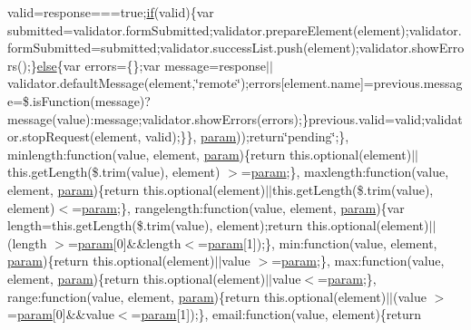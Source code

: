 \begin{DoxyCompactItemize}
valid=response===true;\hyperlink{_scripts_2respond_8min_8js_a93851d60dd037a83509a1757b9ee7b66}{if}(valid)\{var submitted=validator.\+form\+Submitted;validator.\+prepare\+Element(element);validator.\+form\+Submitted=submitted;validator.\+success\+List.\+push(element);validator.\+show\+Errors();\}\hyperlink{_scripts_2jquery_8validate_8js_a0544c3fe466e421738dae463968b70ba}{else}\{var errors=\{\};var message=response$\vert$$\vert$validator.\+default\+Message(element,\char`\"{}remote\char`\"{});errors\mbox{[}element.\+name\mbox{]}=previous.\+message=\$.is\+Function(message)?message(value)\+:message;validator.\+show\+Errors(errors);\}previous.\+valid=valid;validator.\+stop\+Request(element, valid);\}\}, \hyperlink{_scripts_2jquery-1_810_82_8min_8js_ae8915303d11557d1b001bc56b6195251}{param}));return\char`\"{}pending\char`\"{};\}, minlength\+:function(value, element, \hyperlink{_scripts_2jquery-1_810_82_8min_8js_ae8915303d11557d1b001bc56b6195251}{param})\{return this.\+optional(element)$\vert$$\vert$this.\+get\+Length(\$.trim(value), element) $>$=\hyperlink{_scripts_2jquery-1_810_82_8min_8js_ae8915303d11557d1b001bc56b6195251}{param};\}, maxlength\+:function(value, element, \hyperlink{_scripts_2jquery-1_810_82_8min_8js_ae8915303d11557d1b001bc56b6195251}{param})\{return this.\+optional(element)$\vert$$\vert$this.\+get\+Length(\$.trim(value), element)$<$=\hyperlink{_scripts_2jquery-1_810_82_8min_8js_ae8915303d11557d1b001bc56b6195251}{param};\}, rangelength\+:function(value, element, \hyperlink{_scripts_2jquery-1_810_82_8min_8js_ae8915303d11557d1b001bc56b6195251}{param})\{var length=this.\+get\+Length(\$.trim(value), element);return this.\+optional(element)$\vert$$\vert$(length $>$=\hyperlink{_scripts_2jquery-1_810_82_8min_8js_ae8915303d11557d1b001bc56b6195251}{param}\mbox{[}0\mbox{]}\&\&length$<$=\hyperlink{_scripts_2jquery-1_810_82_8min_8js_ae8915303d11557d1b001bc56b6195251}{param}\mbox{[}1\mbox{]});\}, min\+:function(value, element, \hyperlink{_scripts_2jquery-1_810_82_8min_8js_ae8915303d11557d1b001bc56b6195251}{param})\{return this.\+optional(element)$\vert$$\vert$value $>$=\hyperlink{_scripts_2jquery-1_810_82_8min_8js_ae8915303d11557d1b001bc56b6195251}{param};\}, max\+:function(value, element, \hyperlink{_scripts_2jquery-1_810_82_8min_8js_ae8915303d11557d1b001bc56b6195251}{param})\{return this.\+optional(element)$\vert$$\vert$value$<$=\hyperlink{_scripts_2jquery-1_810_82_8min_8js_ae8915303d11557d1b001bc56b6195251}{param};\}, range\+:function(value, element, \hyperlink{_scripts_2jquery-1_810_82_8min_8js_ae8915303d11557d1b001bc56b6195251}{param})\{return this.\+optional(element)$\vert$$\vert$(value $>$=\hyperlink{_scripts_2jquery-1_810_82_8min_8js_ae8915303d11557d1b001bc56b6195251}{param}\mbox{[}0\mbox{]}\&\&value$<$=\hyperlink{_scripts_2jquery-1_810_82_8min_8js_ae8915303d11557d1b001bc56b6195251}{param}\mbox{[}1\mbox{]});\}, email\+:function(value, element)\{return 
\end{DoxyCompactItemize}
